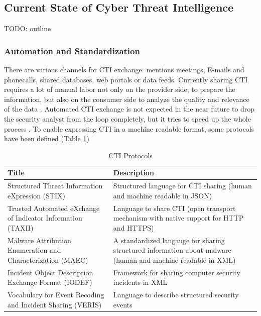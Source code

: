 \subsection{Current State of Cyber Threat Intelligence}
TODO: outline

\subsubsection{Automation and Standardization}
There are various channels for CTI exchange. \cite{wagner_cyber_2019} mentions meetings, E-mails and phonecalls, shared databases, web portals or data feeds. Currently sharing CTI requires a lot of manual labor not only on the provider side, to prepare the information, but also on the consumer side to analyze the quality and relevance of the data \cite{wagner_cyber_2019}. Automated CTI exchange is not expected in the near future to drop the security analyst from the loop completely, but it tries to speed up the whole process \cite{wagner_cyber_2019}. To enable expressing CTI in a machine readable format, some protocols have been defined  (Table \ref{tab:cti-protocols})

\begin{table}[ht]
    \label{tab:cti-protocols}
    \centering
    \begin{tabular}{|p{} p{}|}
    \hline
    \textbf{Title} & \textbf{Description} \\
    \hline
    \hline
    Structured Threat Information eXpression (STIX) \cite{stix_documentation_2024} & Structured language for CTI sharing (human and machine readable in JSON) \\
    \hline
    Trusted Automated eXchange of Indicator Information (TAXII) \cite{stix_documentation_2024} & Language to share CTI (open transport mechanism with native support for HTTP and HTTPS) \\
    \hline
    Malware Attribution Enumeration and Characterization (MAEC) \cite{maec_project_documentation_2024} & A standardized langauge for sharing structured information about malware (human and machine readable in XML) \\
    \hline
    Incident Object Description Exchange Format (IODEF) \cite{kampanakis_incident_2017} & Framework for sharing computer security incidents in XML \\
    \hline
    Vocabulary for Event Recoding and Incident Sharing (VERIS) \cite{veris_framework} & Language to describe structured security events \\
    \hline
    \end{tabular}
    \caption{CTI Protocols \cite{wagner_cyber_2019}}
\end{table}

